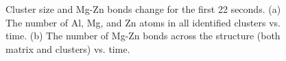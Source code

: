\begingroup
\begin{figure}[!ht]
  \centering
\caption[Cluster size and Mg-Zn bonds change for the first 22 seconds.]{Cluster size and Mg-Zn bonds change for the first 22 seconds. (a) The number of Al, Mg, and Zn atoms in all identified clusters vs. time. (b) The number of Mg-Zn bonds across the structure (both matrix and clusters) vs. time.}
\label{Chap:Al/Vac:fig:long}
\end{figure}
\endgroup





